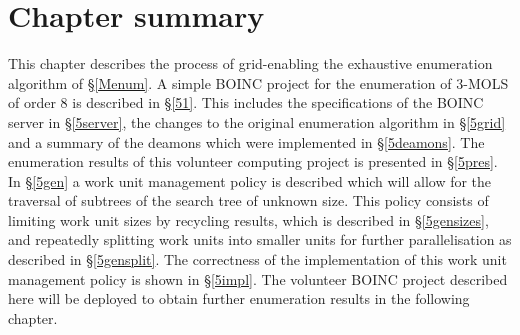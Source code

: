 \section{Chapter summary}
This chapter describes the process of grid-enabling the exhaustive enumeration algorithm of \S\ref{Menum}. A simple BOINC project for the enumeration of 3-MOLS of order 8 is described in \S\ref{51}. This includes the specifications of the BOINC server in \S\ref{5server},   the changes to the original enumeration algorithm in \S\ref{5grid} and a summary of the deamons which were implemented in \S\ref{5deamons}. The enumeration results of this volunteer computing project is presented in \S\ref{5pres}. In \S\ref{5gen} a work unit management policy is described which will allow for the traversal of subtrees of the search tree of unknown size. This policy consists of limiting work unit sizes by recycling results, which is described in \S\ref{5gensizes}, and repeatedly splitting work units into smaller units for further parallelisation as described in \S\ref{5gensplit}. The correctness of the implementation of this work unit management policy is shown in \S\ref{5impl}. The volunteer BOINC project described here will be deployed to obtain further enumeration results in the following chapter.

